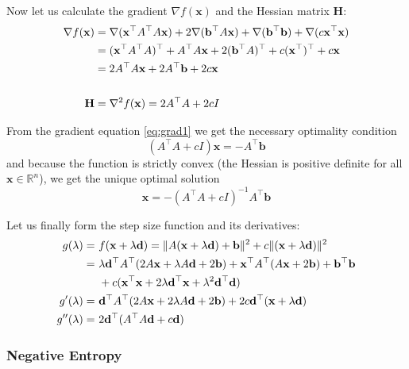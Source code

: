 \documentclass[a4paper,english,titlepage,12pt]{article}
\newcommand{\vect}[1]{\ensuremath{\mathbf{#1}}}
\newcommand{\trans}[1]{\ensuremath\vect{#1}^\top}
\newcommand{\norm}[1]{\ensuremath\Vert #1 \Vert}
\begin{document}
Now let us calculate the gradient $\nabla f(\vect{x})$ and the Hessian matrix \textbf{H}:
\begin{align}
    \nabla f(\vect{x}) &= \nabla(\trans{x} A^\top A \vect{x}) + 2 \nabla(\trans{b} A \vect{x}) + \nabla(\trans{b} \vect{b}) + \nabla(c \trans{x} \vect{x}) \nonumber \\
    &= (\trans{x} A^\top A)^\top + A^\top A \vect{x} + 2 (\trans{b} A)^\top + c (\trans{x})^\top + c \vect{x} \nonumber \\
    &= 2 A^\top A \vect{x} + 2 A^\top \vect{b} + 2 c \vect{x} \label{eq:grad1}\\
    &\nonumber \\
    \textbf{H} &= \nabla^2 f(\vect{x}) = 2 A^\top A + 2 c I\label{eq:hess1}
\end{align}

From the gradient equation \eqref{eq:grad1} we get the necessary optimality condition
\begin{equation}
    (A^\top A + c I) \vect{x} = - A^\top \vect{b}
\end{equation}
and because the function is strictly convex (the Hessian is positive definite for all $\vect{x} \in \mathbb{R}^n$), we get the unique optimal solution
\begin{equation}
    \vect{x} = - (A^\top A + c I)^{-1} A^\top \vect{b}
\end{equation}

Let us finally form the step size function and its derivatives:
\begin{align}
    g(\lambda) =\ &f(\vect{x} + \lambda \vect{d}) = \norm{A (\vect{x} + \lambda \vect{d}) + \vect{b}} ^ 2 + c \norm{(\vect{x} + \lambda \vect{d})} ^ 2 \nonumber \\
    =\ &\lambda \trans{d} A^\top ( 2 A \vect{x} + \lambda A \vect{d} + 2 \vect{b}) + \trans{x} A^\top ( A \vect{x} + 2 \vect{b} ) + \trans{b} \vect{b} \\
    &+ c ( \trans{x} \vect{x} + 2 \lambda \trans{d} \vect{x} + \lambda ^ 2 \trans{d} \vect{d}) \nonumber \\
    g'(\lambda) =\ &\trans{d} A^\top ( 2 A \vect{x} + 2 \lambda A \vect{d} + 2 \vect{b} ) + 2 c \trans{d} ( \vect{x} + \lambda \vect{d} ) \\
    g''(\lambda) =\ &2 \trans{d} ( A^\top A \vect{d} + c \vect{d})
\end{align}


\subsubsection{Negative Entropy}
\end{document}

